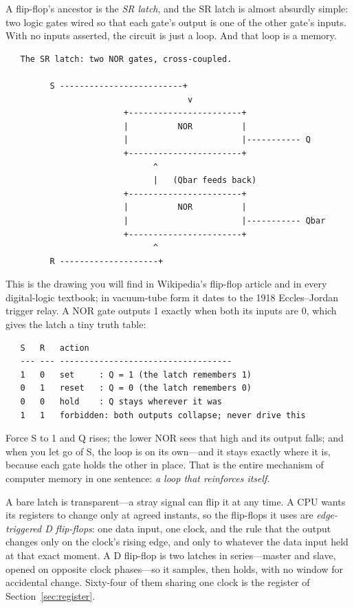A flip-flop's ancestor is the \emph{SR latch}, and the SR latch is
almost absurdly simple: two logic gates wired so that each gate's
output is one of the other gate's inputs. With no inputs asserted,
the circuit is just a loop. And that loop is a memory.

\begin{verbatim}
   The SR latch: two NOR gates, cross-coupled.

         S -------------------------+
                                     v
                        +-----------------------+
                        |          NOR          |
                        |                       |----------- Q
                        +-----------------------+
                              ^
                              |   (Qbar feeds back)
                        +-----------------------+
                        |          NOR          |
                        |                       |----------- Qbar
                        +-----------------------+
                              ^
         R --------------------+
\end{verbatim}

This is the drawing you will find in Wikipedia's flip-flop article
and in every digital-logic textbook; in vacuum-tube form it dates to
the 1918 Eccles--Jordan trigger relay. A NOR gate outputs 1 exactly
when both its inputs are 0, which gives the latch a tiny truth table:

\begin{verbatim}
   S   R   action
   --- --- -----------------------------------
   1   0   set     : Q = 1 (the latch remembers 1)
   0   1   reset   : Q = 0 (the latch remembers 0)
   0   0   hold    : Q stays wherever it was
   1   1   forbidden: both outputs collapse; never drive this
\end{verbatim}

Force S to 1 and Q rises; the lower NOR sees that high and its output
falls; and when you let go of S, the loop is on its own---and it
stays exactly where it is, because each gate holds the other in
place. That is the entire mechanism of computer memory in one
sentence: \emph{a loop that reinforces itself}.

A bare latch is transparent---a stray signal can flip it at any time.
A CPU wants its registers to change only at agreed instants, so the
flip-flops it uses are \emph{edge-triggered D flip-flops}: one data
input, one clock, and the rule that the output changes only on the
clock's rising edge, and only to whatever the data input held at that
exact moment. A D flip-flop is two latches in series---master and
slave, opened on opposite clock phases---so it samples, then holds,
with no window for accidental change. Sixty-four of them sharing one
clock is the register of Section~\ref{sec:register}.

